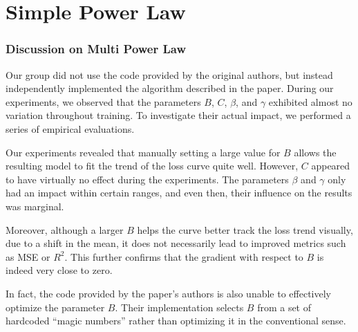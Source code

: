 \documentclass[aspectratio=169]{beamer}
\begin{document}
\section{Simple Power Law}\label{sec:simplepowerlaw}

\begin{frame}
    \frametitle{Discussion on Multi Power Law}
    Our group did not use the code provided by the original authors,
    but instead independently implemented the algorithm described in the paper.
    During our experiments, we observed that the parameters $B$, $C$,
    $\beta$, and $\gamma$ exhibited almost no variation throughout
    training. To investigate their actual impact, we performed a
    series of empirical evaluations.

    Our experiments revealed that manually setting a large value for
    $B$ allows the resulting model to fit the trend of the loss curve
    quite well. However, $C$ appeared to have virtually no effect
    during the experiments. The parameters $\beta$ and $\gamma$ only
    had an impact within certain ranges, and even then, their
    influence on the results was marginal.

    Moreover, although a larger $B$ helps the curve better track the
    loss trend visually, due to a shift in the mean, it does not
    necessarily lead to improved metrics such as MSE or $R^2$. This
    further confirms that the gradient with respect to $B$ is indeed
    very close to zero.

    In fact, the code provided by the paper’s authors is also unable
    to effectively optimize the parameter $B$. Their implementation
    selects $B$ from a set of hardcoded ``magic numbers'' rather than
    optimizing it in the conventional sense.
\end{frame}
\end{document}
